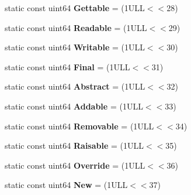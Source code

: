\begin{DoxyCompactItemize}
\item 
\hypertarget{class_entry_a60716f4c18230f0c525942d717ddc1a9}{static const uint64 {\bfseries Gettable} = (1\-U\-L\-L$<$$<$28)}\label{class_entry_a60716f4c18230f0c525942d717ddc1a9}

\item 
\hypertarget{class_entry_ad03632f35c9065e21a438a80e3f132bd}{static const uint64 {\bfseries Readable} = (1\-U\-L\-L$<$$<$29)}\label{class_entry_ad03632f35c9065e21a438a80e3f132bd}

\item 
\hypertarget{class_entry_ac27432292f9fe943794a08ca75adcb7f}{static const uint64 {\bfseries Writable} = (1\-U\-L\-L$<$$<$30)}\label{class_entry_ac27432292f9fe943794a08ca75adcb7f}

\item 
\hypertarget{class_entry_a4428b3fe059de0241a4ced90352f1b48}{static const uint64 {\bfseries Final} = (1\-U\-L\-L$<$$<$31)}\label{class_entry_a4428b3fe059de0241a4ced90352f1b48}

\item 
\hypertarget{class_entry_aa584f178f9face10dc1d5d790b96dcb5}{static const uint64 {\bfseries Abstract} = (1\-U\-L\-L$<$$<$32)}\label{class_entry_aa584f178f9face10dc1d5d790b96dcb5}

\item 
\hypertarget{class_entry_abcdd502e91eac117a635b51f7ed5b0cd}{static const uint64 {\bfseries Addable} = (1\-U\-L\-L$<$$<$33)}\label{class_entry_abcdd502e91eac117a635b51f7ed5b0cd}

\item 
\hypertarget{class_entry_a094d98fd6de6d0a7a1e8153e09d38fd3}{static const uint64 {\bfseries Removable} = (1\-U\-L\-L$<$$<$34)}\label{class_entry_a094d98fd6de6d0a7a1e8153e09d38fd3}

\item 
\hypertarget{class_entry_a65f63e50efa370d68e64e0acc5226aea}{static const uint64 {\bfseries Raisable} = (1\-U\-L\-L$<$$<$35)}\label{class_entry_a65f63e50efa370d68e64e0acc5226aea}

\item 
\hypertarget{class_entry_a80b8d1eb8fe7f4a2facaaab46860e238}{static const uint64 {\bfseries Override} = (1\-U\-L\-L$<$$<$36)}\label{class_entry_a80b8d1eb8fe7f4a2facaaab46860e238}

\item 
\hypertarget{class_entry_aef5749e3ed01ac73ab20a0e70333b53d}{static const uint64 {\bfseries New} = (1\-U\-L\-L$<$$<$37)}\label{class_entry_aef5749e3ed01ac73ab20a0e70333b53d}


\end{DoxyCompactItemize}
